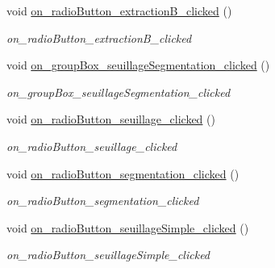 \begin{DoxyCompactItemize}
\mbox{\label{classAppMainWindow_a060bb63eea429b322b274ab70649cc47}} 
void \hyperlink{classAppMainWindow_a060bb63eea429b322b274ab70649cc47}{on\+\_\+radio\+Button\+\_\+extraction\+B\+\_\+clicked} ()
\begin{DoxyCompactList}\small\item\em on\+\_\+radio\+Button\+\_\+extraction\+B\+\_\+clicked \end{DoxyCompactList}\item 
\mbox{\label{classAppMainWindow_af2747bc08aa9f5256c7b3193571cbb34}} 
void \hyperlink{classAppMainWindow_af2747bc08aa9f5256c7b3193571cbb34}{on\+\_\+group\+Box\+\_\+seuillage\+Segmentation\+\_\+clicked} ()
\begin{DoxyCompactList}\small\item\em on\+\_\+group\+Box\+\_\+seuillage\+Segmentation\+\_\+clicked \end{DoxyCompactList}\item 
\mbox{\label{classAppMainWindow_a2ea6682a925bd79c362823e731f2382f}} 
void \hyperlink{classAppMainWindow_a2ea6682a925bd79c362823e731f2382f}{on\+\_\+radio\+Button\+\_\+seuillage\+\_\+clicked} ()
\begin{DoxyCompactList}\small\item\em on\+\_\+radio\+Button\+\_\+seuillage\+\_\+clicked \end{DoxyCompactList}\item 
\mbox{\label{classAppMainWindow_a4bc1c1b0ca46ffd7bd26141aa6f130dc}} 
void \hyperlink{classAppMainWindow_a4bc1c1b0ca46ffd7bd26141aa6f130dc}{on\+\_\+radio\+Button\+\_\+segmentation\+\_\+clicked} ()
\begin{DoxyCompactList}\small\item\em on\+\_\+radio\+Button\+\_\+segmentation\+\_\+clicked \end{DoxyCompactList}\item 
\mbox{\label{classAppMainWindow_a578a5ab65f2b64536d6d7d7588d603c1}} 
void \hyperlink{classAppMainWindow_a578a5ab65f2b64536d6d7d7588d603c1}{on\+\_\+radio\+Button\+\_\+seuillage\+Simple\+\_\+clicked} ()
\begin{DoxyCompactList}\small\item\em on\+\_\+radio\+Button\+\_\+seuillage\+Simple\+\_\+clicked \end{DoxyCompactList}\item 

\end{DoxyCompactItemize}
